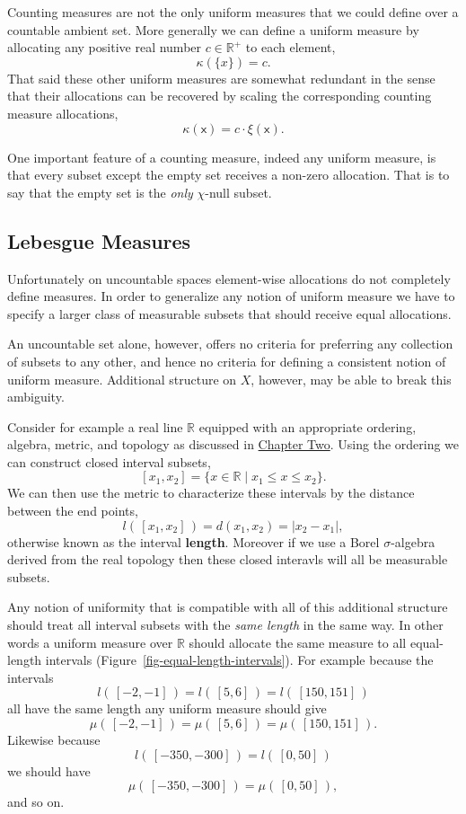 \documentclass[
  letterpaper,
  DIV=11,
  numbers=noendperiod]{scrartcl}
\begin{document}
Counting measures are not the only uniform measures that we could define
over a countable ambient set. More generally we can define a uniform
measure by allocating any positive real number \(c \in \mathbb{R}^{+}\)
to each element, \[
\kappa(\{ x \}) = c.
\] That said these other uniform measures are somewhat redundant in the
sense that their allocations can be recovered by scaling the
corresponding counting measure allocations, \[
\kappa ( \mathsf{x} ) = c \cdot \xi ( \mathsf{x} ).
\]

One important feature of a counting measure, indeed any uniform measure,
is that every subset except the empty set receives a non-zero
allocation. That is to say that the empty set is the \emph{only}
\(\chi\)-null subset.

\hypertarget{sec:lebesgue}{%
\subsection{Lebesgue Measures}\label{sec:lebesgue}}

Unfortunately on uncountable spaces element-wise allocations do not
completely define measures. In order to generalize any notion of uniform
measure we have to specify a larger class of measurable subsets that
should receive equal allocations.

An uncountable set alone, however, offers no criteria for preferring any
collection of subsets to any other, and hence no criteria for defining a
consistent notion of uniform measure. Additional structure on \(X\),
however, may be able to break this ambiguity.

Consider for example a real line \(\mathbb{R}\) equipped with an
appropriate ordering, algebra, metric, and topology as discussed in
\href{https://betanalpha.github.io/assets/chapters_html/spaces.html}{Chapter
Two}. Using the ordering we can construct closed interval subsets, \[
[ x_{1}, x_{2} ] = \{ x \in \mathbb{R} \mid x_{1} \le x \le x_{2} \}.
\] We can then use the metric to characterize these intervals by the
distance between the end points, \[
l( \, [ x_{1}, x_{2} ] \, ) = d( x_{1}, x_{2} ) = | x_{2} - x_{1} |,
\] otherwise known as the interval \textbf{length}. Moreover if we use a
Borel \(\sigma\)-algebra derived from the real topology then these
closed interavls will all be measurable subsets.

Any notion of uniformity that is compatible with all of this additional
structure should treat all interval subsets with the \emph{same length}
in the same way. In other words a uniform measure over \(\mathbb{R}\)
should allocate the same measure to all equal-length intervals
(Figure~\ref{fig-equal-length-intervals}). For example because the
intervals \[
l( \, [-2, -1] \, ) = l( \, [5, 6] \, ) = l( \, [150, 151] \,)
\] all have the same length any uniform measure should give \[
\mu( \, [-2, -1] \, ) = \mu( \, [5, 6] \, ) = \mu( \, [150, 151] \, ).
\] Likewise because \[
l( \, [-350, -300] \, ) = l( \, [0, 50] \, )
\] we should have \[
\mu( \, [-350, -300] \, ) = \mu( \, [0, 50] \,),
\] and so on.
\end{document}
